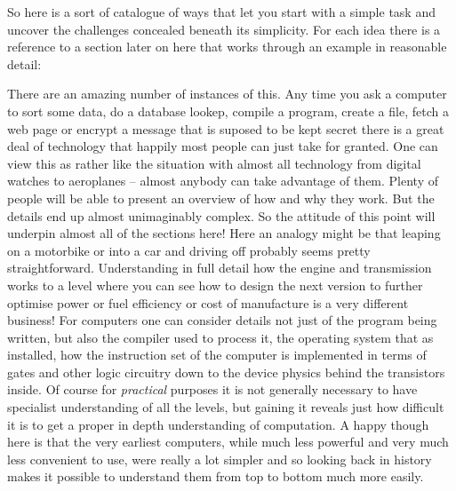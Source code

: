 So here is a sort of catalogue of ways that let you start with a simple
task and uncover the challenges concealed beneath its simplicity. For each
idea there is a reference to a section later on here that works through
an example in reasonable detail:


\begin{longdescription}
\item[Look beneath the abstraction to understand how something  
is implemented or how it ``really'' works]

There are an amazing number of instances of this. Any time you ask a
computer to sort some data, do a database lookep, compile a program,
create a file, fetch a web page or encrypt a message that is suposed to
be kept secret there is a great deal of technology that happily most
people can just take for granted. One can view this as rather like the
situation with almost all technology from digital watches to aeroplanes -- 
almost anybody can take advantage of them. Plenty of people will be able 
to present an overview of how and why they work. But the details end up
almost unimaginably complex. So the attitude of this point will underpin
almost all of the sections here! Here an analogy might be that leaping
on a motorbike or into a car and driving off probably seems pretty
straightforward. Understanding in full detail how the engine and
transmission works to a level where you can see how to design the
next version to further optimise power or fuel efficiency or cost of
manufacture is a very different business! For computers one can consider
details not just of the program being written, but also the compiler used
to process it, the operating system that as installed, how the instruction
set of the computer is implemented in terms of gates and other logic
circuitry down to the device physics behind the transistors inside.
Of course for {\em practical} purposes it is not generally necessary to
have specialist understanding of all the levels, but gaining it reveals
just how difficult it is to get a proper in depth understanding of
computation. A happy though here is that the very earliest computers,
while much less powerful and very much less convenient to use, were
really a lot simpler and so looking back in history makes it possible
to understand them from top to bottom much more easily. 


\end{longdescription}
